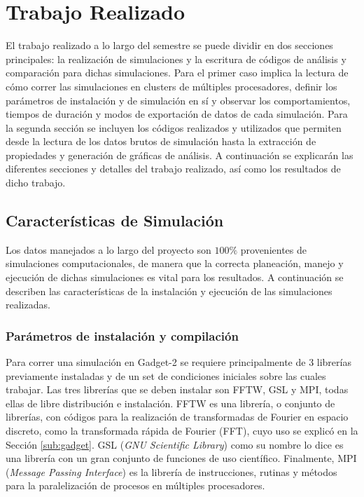 \chapter{Trabajo Realizado}
\label{chap:trabajo}
El trabajo realizado a lo largo del semestre se puede dividir en dos secciones principales: la realización de simulaciones y la escritura de códigos de análisis y comparación para dichas simulaciones. Para el primer caso implica la lectura de cómo correr las simulaciones en clusters de múltiples procesadores, definir los parámetros de instalación y de simulación en sí y observar los comportamientos, tiempos de duración y modos de exportación de datos de cada simulación. Para la segunda sección se incluyen los códigos realizados y utilizados que permiten desde la lectura de los datos brutos de simulación hasta la extracción de propiedades y generación de gráficas de análisis. A continuación se explicarán las diferentes secciones y detalles del trabajo realizado, así como los resultados de dicho trabajo.

\section{Características de Simulación}
Los datos manejados a lo largo del proyecto son $100\%$ provenientes de simulaciones computacionales, de manera que la correcta planeación, manejo y ejecución de dichas simulaciones es vital para los resultados. A continuación se describen las características de la instalación y ejecución de las simulaciones realizadas.

\subsection{Parámetros de instalación y compilación}
Para correr una simulación en Gadget-2 se requiere principalmente de 3 librerías previamente instaladas y de un set de condiciones iniciales sobre las cuales trabajar. Las tres librerías que se deben instalar son FFTW, GSL y MPI, todas ellas de libre distribución e instalación. FFTW es una librería, o conjunto de librerías, con códigos para la realización de transformadas de Fourier en espacio discreto, como la transformada rápida de Fourier (FFT), cuyo uso se explicó en la Sección \ref{sub:gadget}. GSL (\textit{GNU Scientific Library}) como su nombre lo dice es una librería con un gran conjunto de funciones de uso científico. Finalmente, MPI (\textit{Message Passing Interface}) es la librería de instrucciones, rutinas y métodos para la paralelización de procesos en múltiples procesadores. 

